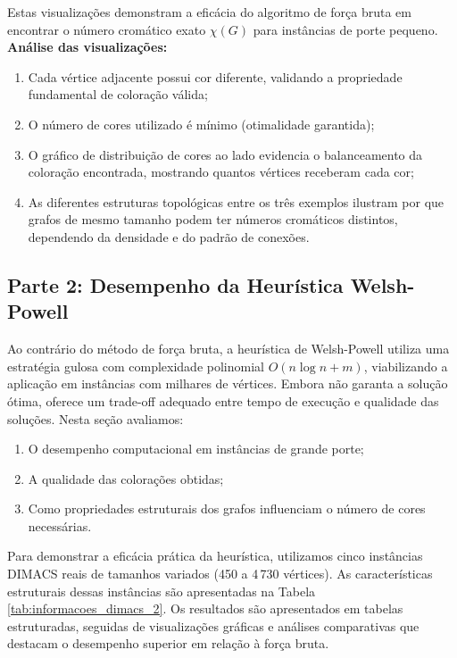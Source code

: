 \documentclass[12pt]{article}
\begin{document}
Estas visualizações demonstram a eficácia do algoritmo de força bruta em encontrar o número cromático exato $\chi(G)$ para instâncias de porte pequeno. \textbf{Análise das visualizações:}

\begin{enumerate}
    \item Cada vértice adjacente possui cor diferente, validando a propriedade fundamental de coloração válida;
    \item O número de cores utilizado é mínimo (otimalidade garantida);
    \item O gráfico de distribuição de cores ao lado evidencia o balanceamento da coloração encontrada, mostrando quantos vértices receberam cada cor;
    \item As diferentes estruturas topológicas entre os três exemplos ilustram por que grafos de mesmo tamanho podem ter números cromáticos distintos, dependendo da densidade e do padrão de conexões.
\end{enumerate}

\subsection{Parte 2: Desempenho da Heurística Welsh-Powell}

Ao contrário do método de força bruta, a heurística de Welsh-Powell utiliza uma estratégia gulosa com complexidade polinomial $O(n \log n + m)$, viabilizando a aplicação em instâncias com milhares de vértices. Embora não garanta a solução ótima, oferece um trade-off adequado entre tempo de execução e qualidade das soluções. Nesta seção avaliamos:

\begin{enumerate}
    \item O desempenho computacional em instâncias de grande porte;
    \item A qualidade das colorações obtidas;
    \item Como propriedades estruturais dos grafos influenciam o número de cores necessárias.
\end{enumerate}

Para demonstrar a eficácia prática da heurística, utilizamos cinco instâncias DIMACS reais de tamanhos variados (450 a 4\,730 vértices). As características estruturais dessas instâncias são apresentadas na Tabela \ref{tab:informacoes_dimacs_2}. Os resultados são apresentados em tabelas estruturadas, seguidas de visualizações gráficas e análises comparativas que destacam o desempenho superior em relação à força bruta.
\end{document}
